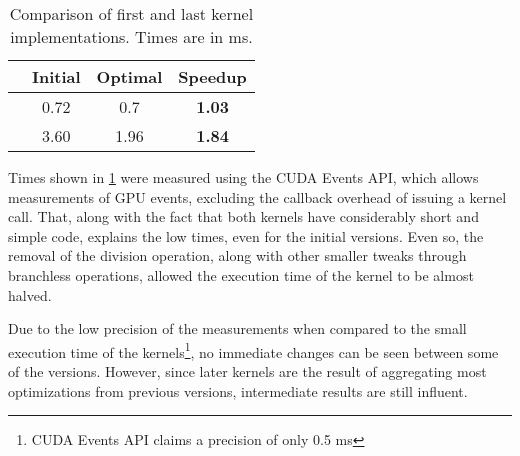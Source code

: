 
\begin{table}
	\centering
	\begin{tabular}{r|cc|c}
						&	Initial	&	Optimal	&	Speedup	\\ \hline
		\computeflux	&	0.72	&	0.7		&	\textbf{1.03}	\\
		\update			&	3.60	&	1.96	&	\textbf{1.84}	\\ \hline
	\end{tabular}
	\caption{Comparison of first and last kernel implementations. Times are in ms.}
	\label{tab:kernel_speedups}
\end{table}

Times shown in \cref{tab:kernel_speedups} were measured using the CUDA Events API, which allows measurements of GPU events, excluding the callback overhead of issuing a kernel call. That, along with the fact that both kernels have considerably short and simple code, explains the low times, even for the initial versions.
Even so, the removal of the division operation, along with other smaller tweaks through branchless operations, allowed the execution time of the \update kernel to be almost halved.

Due to the low precision of the measurements when compared to the small execution time of the kernels\footnote{CUDA Events API claims a precision of only 0.5 ms}, no immediate changes can be seen between some of the versions. However, since later kernels are the result of aggregating most optimizations from previous versions, intermediate results are still influent.
